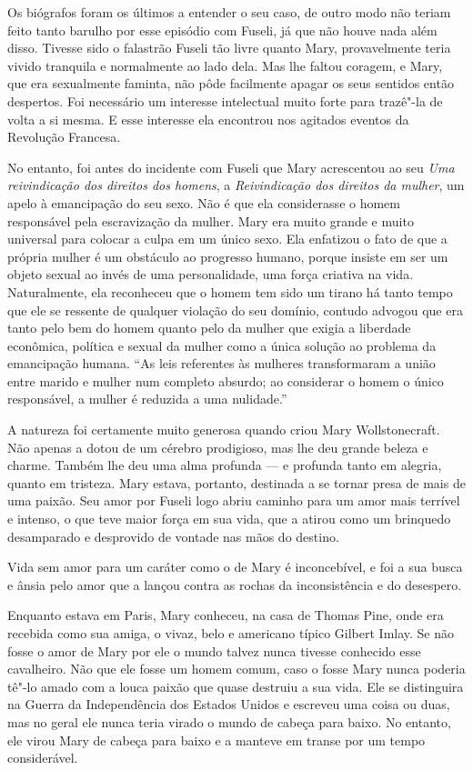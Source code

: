 Os biógrafos foram os últimos a entender o seu caso, de outro modo não
teriam feito tanto barulho por esse episódio com Fuseli, já que não
houve nada além disso. Tivesse sido o falastrão Fuseli tão livre quanto
Mary, provavelmente teria vivido tranquila e normalmente ao lado dela.
Mas lhe faltou coragem, e Mary, que era sexualmente faminta, não pôde
facilmente apagar os seus sentidos então despertos. Foi necessário um
interesse intelectual muito forte para trazê"-la de volta a si mesma. E
esse interesse ela encontrou nos agitados eventos da Revolução Francesa.

No entanto, foi antes do incidente com Fuseli que Mary acrescentou ao
seu \textit{Uma reivindicação dos direitos dos homens}, a
\textit{Reivindicação dos direitos da mulher}, um apelo à emancipação do
seu sexo. Não é que ela considerasse o homem responsável pela
escravização da mulher. Mary era muito grande e muito universal para
colocar a culpa em um único sexo. Ela enfatizou o fato de que a própria
mulher é um obstáculo ao progresso humano, porque insiste em ser um
objeto sexual ao invés de uma personalidade, uma força criativa na vida.
Naturalmente, ela reconheceu que o homem tem sido um tirano há tanto
tempo que ele se ressente de qualquer violação do seu domínio, contudo
advogou que era tanto pelo bem do homem quanto pelo da mulher que exigia
a liberdade econômica, política e sexual da mulher como a única solução
ao problema da emancipação humana. ``As leis referentes às mulheres
transformaram a união entre marido e mulher num completo absurdo; ao considerar o homem 
o único responsável, a mulher é reduzida a uma nulidade.''

A natureza foi certamente muito generosa quando criou Mary
Wollstonecraft. Não apenas a dotou de um cérebro prodigioso, mas lhe deu
grande beleza e charme. Também lhe deu uma alma profunda --- e profunda
tanto em alegria, quanto em tristeza. Mary estava, portanto, destinada a
se tornar presa de mais de uma paixão. Seu amor por Fuseli logo abriu
caminho para um amor mais terrível e intenso, o que teve maior força em
sua vida, que a atirou como um brinquedo desamparado e desprovido de
vontade nas mãos do destino.

Vida sem amor para um caráter como o de Mary é inconcebível, e foi a sua
busca e ânsia pelo amor que a lançou contra as rochas da inconsistência
e do desespero.

Enquanto estava em Paris, Mary conheceu, na casa de Thomas Pine, onde
era recebida como sua amiga, o vivaz, belo e americano típico
Gilbert Imlay. Se não fosse o amor de Mary por ele o mundo talvez
nunca tivesse conhecido esse cavalheiro. Não que ele fosse um homem
comum, caso o fosse Mary nunca poderia tê"-lo amado com a louca paixão
que quase destruiu a sua vida. Ele se distinguira na Guerra da
Independência dos Estados Unidos e escreveu uma coisa ou duas, mas no
geral ele nunca teria virado o mundo de cabeça para baixo. No entanto,
ele virou Mary de cabeça para baixo e a manteve em transe por um tempo
considerável.

